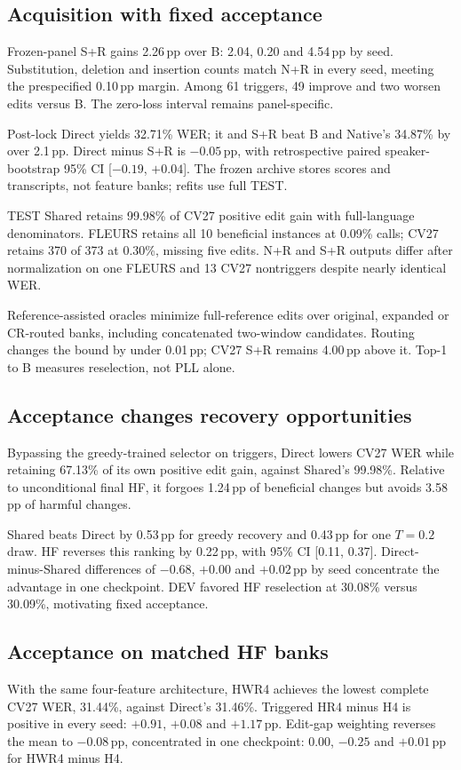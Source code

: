 \subsection{Acquisition with fixed acceptance}

Frozen-panel S+R gains 2.26\,pp over B: 2.04, 0.20 and 4.54\,pp by seed. Substitution, deletion and insertion counts match N+R in every seed, meeting the prespecified 0.10\,pp margin. Among 61 triggers, 49 improve and two worsen edits versus B. The zero-loss interval remains panel-specific.

Post-lock Direct yields 32.71\% WER; it and S+R beat B and Native's 34.87\% by over 2.1\,pp.
Direct minus S+R is $-0.05$\,pp, with retrospective paired speaker-bootstrap 95\% CI [$-0.19$, $+0.04$]. The frozen archive stores scores and transcripts, not feature banks; refits use full TEST.

TEST Shared retains 99.98\% of CV27 positive edit gain with full-language denominators. FLEURS retains all 10 beneficial instances at 0.09\% calls; CV27 retains 370 of 373 at 0.30\%, missing five edits. N+R and S+R outputs differ after normalization on one FLEURS and 13 CV27 nontriggers despite nearly identical WER.

Reference-assisted oracles minimize full-reference edits over original, expanded or CR-routed banks, including concatenated two-window candidates. Routing changes the bound by under 0.01\,pp; CV27 S+R remains 4.00\,pp above it. Top-1 to B measures reselection, not PLL alone.

\subsection{Acceptance changes recovery opportunities}
Bypassing the greedy-trained selector on triggers, Direct lowers CV27 WER while retaining 67.13\% of its own positive edit gain, against Shared's 99.98\%. Relative to unconditional final HF, it forgoes 1.24\,pp of beneficial changes but avoids 3.58\,pp of harmful changes.

Shared beats Direct by 0.53\,pp for greedy recovery and 0.43\,pp for one $T=0.2$ draw. HF reverses this ranking by 0.22\,pp, with 95\% CI [0.11, 0.37]. Direct-minus-Shared differences of $-0.68$, $+0.00$ and $+0.02$\,pp by seed concentrate the advantage in one checkpoint. DEV favored HF reselection at 30.08\% versus 30.09\%, motivating fixed acceptance.

\subsection{Acceptance on matched HF banks}

With the same four-feature architecture, HWR4 achieves the lowest complete CV27 WER, 31.44\%, against Direct's 31.46\%. Triggered HR4 minus H4 is positive in every seed: $+0.91$, $+0.08$ and $+1.17$\,pp. Edit-gap weighting reverses the mean to $-0.08$\,pp, concentrated in one checkpoint: $0.00$, $-0.25$ and $+0.01$\,pp for HWR4 minus H4.

